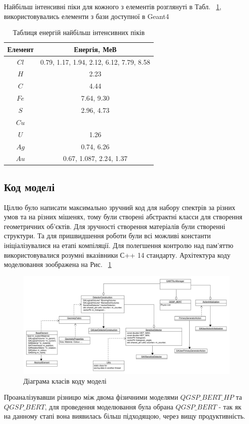 \documentclass[a4paper, 14pt]{article}
\numberwithin{equation}{section}
\numberwithin{table}{section}
\begin{document}
	Найбільш інтенсивні піки для кожного з елементів розглянуті в Табл. ~\ref{tabl:ElementsEnergy}, використовувались елементи з бази доступної в Geant4
	\begin{table}[h]
		\centering
		\caption{Таблиця енергій найбільш інтенсивних піків} 
		\begin{tabular}{|c|c|} 
			\hline
			Елемент& Енергія, МеВ \\
			\hline
			$Cl$ & 0.79, 1.17, 1.94, 2.12, 6.12, 7.79, 8.58 \\
			\hline
			$H$ & 2.23 \\
			\hline
			$C$ & 4.44 \\
			\hline
			$Fe$ & 7.64, 9.30 \\		
			\hline
			$S$ & 2.96, 4.73 \\
			\hline
			$Cu$ &  \\
			\hline
			$U$ & 1.26\\
			\hline
			$Ag$ &  0.74, 6.26 \\
			\hline
			$Au$ & 0.67, 1.087, 2.24, 1.37  \\
			
			\hline
		\end{tabular}
		\label{tabl:ElementsEnergy}
	\end{table}
	
	\subsection{Код моделі}
	Ціллю було написати максимально зручний код для набору спектрів за різних умов та на різних мішенях, тому були створені абстрактні класси для створення геометричних об'єктів. Для зручності створення матеріалів були створенні структури. 
	Та для пришвидшення роботи були всі можливі константи ініціалізувалися на етапі компіляції. Для полегшення контролю над пам'яттю використовувалися розумні вказівники С++ 14 стандарту. Архітектура коду моделювання зоображена на Рис. ~\ref{ris:s_classDiagram} 
	\begin{figure}[hbt!]
		\centering \includegraphics[width=1\textwidth]{res/classDiagram.pdf}
		\caption{Діаграма класів коду моделі} 
		\label{ris:s_classDiagram}	
	\end{figure} 
	Проаналізувавши різницю між двома фізичними моделями $QGSP\_BERT\_HP$ та $QGSP\_BERT$, для проведення моделювання була обрана $QGSP\_BERT$ - так як на данному єтапі вона виявилась більш підходящою, через вищу продуктивність.
	
\end{document}
